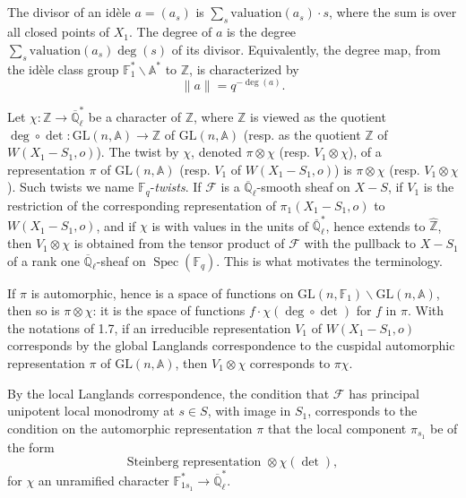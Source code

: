 \documentclass[11pt,a4paper]{article}
\theoremstyle{plain}
\theoremstyle{definition}
\DeclareMathOperator{\Spec}{Spec}
\newcommand{\Ql}{\overline{\mathbb{Q}}_\ell}
\newcommand{\Fq}{\mathbb{F}_q}
\newcommand{\Z}{\mathbb{Z}}
\newcommand{\GL}{\mathrm{GL}}
\begin{document}
\subsection{}

The divisor of an id\`ele $a = (a_s)$ is $\sum_s \mathrm{valuation}(a_s) \cdot s$, where the sum is over all closed points of $X_1$. The degree of $a$ is the degree $\sum_s \mathrm{valuation}(a_s) \deg(s)$ of its divisor. Equivalently, the degree map, from the id\`ele class group $\mathbb{F}_1^* \backslash \mathbb{A}^*$ to $\Z$, is characterized by
\begin{equation}
\|a\| = q^{-\deg(a)}.
\end{equation}

Let $\chi: \Z \to \Ql^*$ be a character of $\Z$, where $\Z$ is viewed as the quotient $\deg \circ \det: \GL(n, \mathbb{A}) \to \Z$ of $\GL(n, \mathbb{A})$ (resp. as the quotient $\Z$ of $W(X_1 - S_1, o)$). The twist by $\chi$, denoted $\pi \otimes \chi$ (resp. $V_1 \otimes \chi$), of a representation $\pi$ of $\GL(n, \mathbb{A})$ (resp. $V_1$ of $W(X_1 - S_1, o)$) is $\pi \otimes \chi$ (resp. $V_1 \otimes \chi$). Such twists we name $\Fq$-\emph{twists}. If $\mathcal{F}$ is a $\Ql$-smooth sheaf on $X - S$, if $V_1$ is the restriction of the corresponding representation of $\pi_1(X_1 - S_1, o)$ to $W(X_1 - S_1, o)$, and if $\chi$ is with values in the units of $\Ql^*$, hence extends to $\hat{\Z}$, then $V_1 \otimes \chi$ is obtained from the tensor product of $\mathcal{F}$ with the pullback to $X - S_1$ of a rank one $\Ql$-sheaf on $\Spec(\Fq)$. This is what motivates the terminology.

If $\pi$ is automorphic, hence is a space of functions on $\GL(n, \mathbb{F}_1) \backslash \GL(n, \mathbb{A})$, then so is $\pi \otimes \chi$: it is the space of functions $f \cdot \chi(\deg \circ \det)$ for $f$ in $\pi$. With the notations of 1.7, if an irreducible representation $V_1$ of $W(X_1 - S_1, o)$ corresponds by the global Langlands correspondence to the cuspidal automorphic representation $\pi$ of $\GL(n, \mathbb{A})$, then $V_1 \otimes \chi$ corresponds to $\pi \chi$.

By the local Langlands correspondence, the condition that $\mathcal{F}$ has principal unipotent local monodromy at $s \in S$, with image in $S_1$, corresponds to the condition on the automorphic representation $\pi$ that the local component $\pi_{s_1}$ be of the form
\begin{equation}
\text{Steinberg representation } \otimes \chi(\det), \tag{1.10.2}
\end{equation}
for $\chi$ an unramified character $\mathbb{F}_{1s_1}^* \to \Ql^*$.
\end{document}
